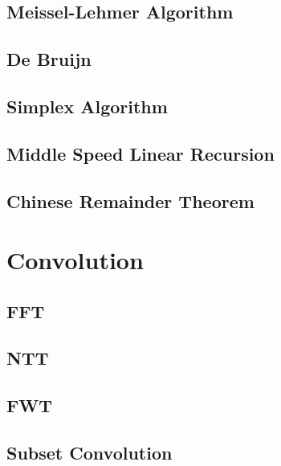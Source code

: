 \documentclass[a4paper,10pt,twocolumn,oneside]{article}
\begin{document}
\subsection{Meissel-Lehmer Algorithm}


\subsection{De Bruijn}


\subsection{Simplex Algorithm}


\subsection{Middle Speed Linear Recursion}


\subsection{Chinese Remainder Theorem}


\section{Convolution}

\subsection{FFT}


\subsection{NTT}


\subsection{FWT}


\subsection{Subset Convolution}

\end{document}
